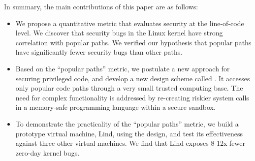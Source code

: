 In summary, the main contributions of this paper are as follows:

\begin{itemize}\setlength\itemsep{0em}

\item
We propose a quantitative metric that evaluates security at the line-of-code level. 
We discover that security bugs in the Linux kernel have strong correlation with popular paths. 
We verified our hypothesis that popular paths have significantly fewer security bugs than other paths. 

\item
Based on the ``popular paths'' metric, we postulate a new approach for securing privileged code,
and develop a new design scheme called \lip. It
accesses only popular code paths
through a very small trusted computing base.
The need for complex functionality is addressed by re-creating riskier system calls
in a memory-safe programming language within a secure sandbox.

\item
To demonstrate the practicality of the ``popular paths'' metric, we build a prototype virtual machine, Lind, using the \lip design,
and test its effectiveness against three other virtual machines. We find that
Lind exposes 8-12x fewer zero-day kernel bugs. 
\end{itemize}

